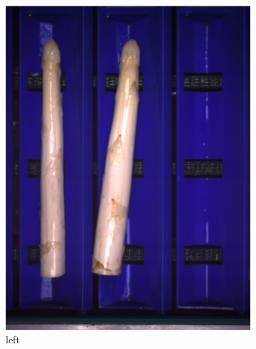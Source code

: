 \begin{figure}[h]
	\centering
	\vspace{20pt}
	\begin{subfigure}{0.3\textwidth}
		\includegraphics[width=0.95\linewidth]{Figures/chapter02/anna_a.png}
		\caption{left}
	\end{subfigure}
	\begin{subfigure}{0.3\textwidth}

\end{subfigure}
\end{figure}
